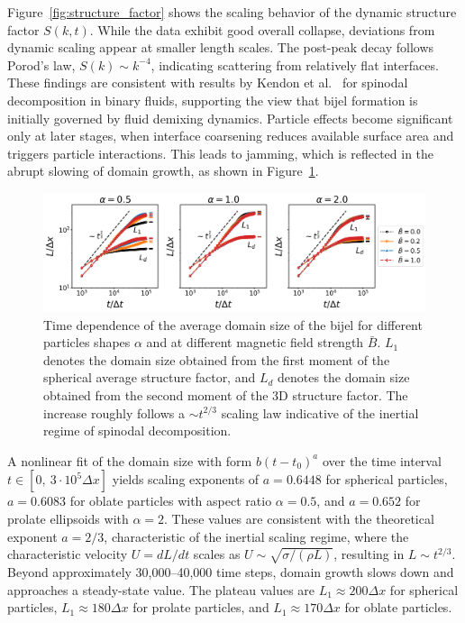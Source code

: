 Figure~\ref{fig:structure_factor} shows the scaling behavior of the dynamic structure factor \(S(k, t)\). While the data exhibit good overall 
collapse, deviations from dynamic scaling appear at smaller length scales. The post-peak decay follows Porod's law, \(S(k) \sim k^{-4}\), indicating 
scattering from relatively flat interfaces. These findings are consistent with results by Kendon et al.~\cite{kendon_3d_1999, kendon_inertial_2001} 
for spinodal decomposition in binary fluids, supporting the view that bijel formation is initially governed by fluid demixing dynamics. Particle effects 
become significant only at later stages, when interface coarsening reduces available surface area and triggers particle interactions. This leads to jamming, 
which is reflected in the abrupt slowing of domain growth, as shown in Figure~\ref{fig:domain_size}.


\begin{figure}
    \centering
    \includegraphics[width=\textwidth]{../figures/results/paper1/domain_size.png}
    \caption{Time dependence of the average domain size of the bijel for different particles shapes $\alpha$ and at different magnetic field strength $\bar{B}$. $L_1$ denotes the domain size obtained from the first moment of the spherical average structure factor, and $L_d$ denotes the domain size obtained from the second moment of the 3D structure factor. The increase roughly follows a $\sim t^{2/3}$ scaling law indicative of the inertial regime of spinodal decomposition.}
    \label{fig:domain_size}
\end{figure}
    
A nonlinear fit of the domain size with form \(b(t - t_0)^a\) over the time interval \(t \in [0,\ 3 \cdot 10^5 \Delta x]\) yields scaling exponents of \(a = 0.6448\) 
for spherical particles, \(a = 0.6083\) for oblate particles with aspect ratio \(\alpha = 0.5\), and \(a = 0.652\) for prolate ellipsoids with \(\alpha = 2\). 
These values are consistent with the theoretical exponent \(a = 2/3\), characteristic of the inertial scaling regime, where the characteristic velocity 
\(U = dL/dt\) scales as \(U \sim \sqrt{\sigma / (\rho L)}\), resulting in \(L \sim t^{2/3}\).
Beyond approximately 30,000–40,000 time steps, domain growth slows down and approaches a steady-state value. The plateau values are \(L_1 \approx 200 \Delta x\) 
for spherical particles, \(L_1 \approx 180 \Delta x\) for prolate particles, and \(L_1 \approx 170 \Delta x\) for oblate particles.
    
